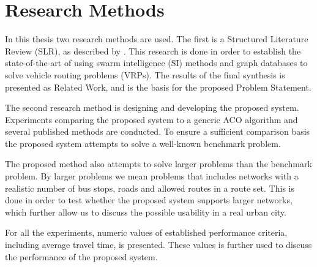 \section{Research Methods}


In this thesis two research methods are used. The first is a Structured Literature Review (SLR), as described by \citep{kofod2014}. This research is done in order to establish the state-of-the-art of using swarm intelligence (SI) methods and graph databases to solve vehicle routing problems (VRPs). The results of the final synthesis is presented as Related Work, and is the basis for the proposed Problem Statement.

The second research method is designing and developing the proposed system. Experiments comparing the proposed system to a generic ACO algorithm and several published methods are conducted. To ensure a sufficient comparison basis the proposed system attempts to solve a well-known benchmark problem. 

The proposed method also attempts to solve larger problems than the benchmark problem. By larger problems we mean problems that includes networks with a realistic number of bus stops, roads and allowed routes in a route set. This is done in order to test whether the proposed system supports larger networks, which further allow us to discuss the possible usability in a real urban city. 

For all the experiments, numeric values of established performance criteria, including average travel time, is presented. These values is further used to discuss the performance of the proposed system. 




